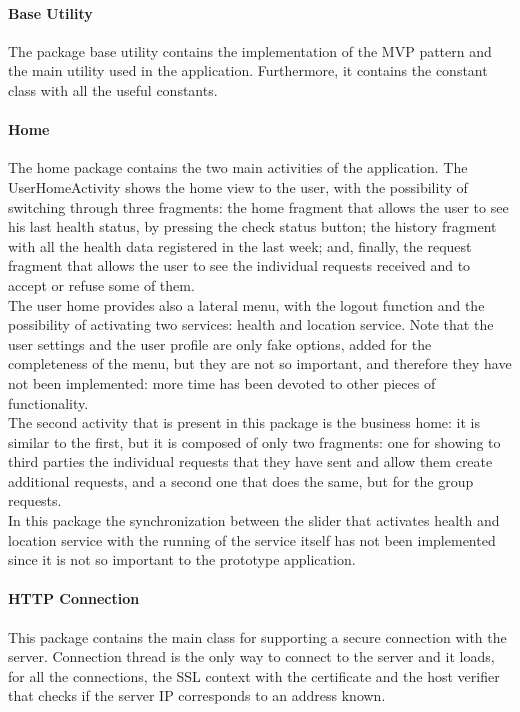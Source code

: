 \paragraph{Base Utility}
The package base utility contains the implementation of the MVP pattern and the main utility used in the application. 
Furthermore, it contains the constant class with all the useful constants.

\paragraph{Home}
The home package contains the two main activities of the application. 
The UserHomeActivity shows the home view to the user, with the possibility of switching through three fragments: the home fragment that allows
the user to see his last health status, by pressing the check status button; the history fragment with all the health data registered in the 
last week; and, finally, the request fragment that allows the user to see the individual requests received and to accept or refuse some of
them. \\
The user home provides also a lateral menu, with the logout function and the possibility of activating two services: health and location
service. 
Note that the user settings and the user profile are only fake options, added for the completeness of the menu, but they are not so important,
and therefore they have not been implemented: more time has been devoted to other pieces of functionality. \\
The second activity that is present in this package is the business home: it is similar to the first, but it is composed of only two
fragments: one for showing to third parties the individual requests that they have sent and allow them create additional requests, and a
second one that does the same, but for the group requests.\\
In this package the synchronization between the slider that activates health and location service with the running of the service itself has
not been implemented since it is not so important to the prototype application.

\paragraph{HTTP Connection}
This package contains the main class for supporting a secure connection with the server. 
Connection thread is the only way to connect to the server and it loads, for all the connections, the SSL context with the certificate and the 
host verifier that checks if the server IP corresponds to an address known. 

